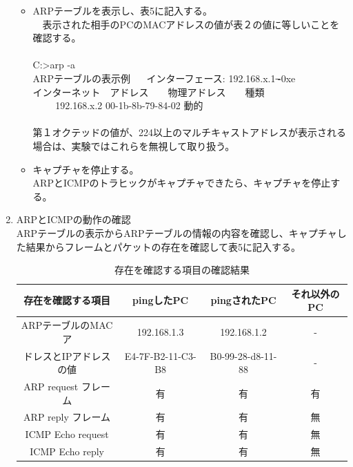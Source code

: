 \documentclass[10pt]{article}
\begin{document}
\begin{enumerate}
\begin{itemize}
        
            \item ARPテーブルを表示し、表5に記入する。\\ 　表示された相手のPCのMACアドレスの値が表２の値に等しいことを確認する。\\\\
                     C:>arp -a \\
                        ARPテーブルの表示例 　
                        インターフェース: 192.168.x.1 ̶-0xe \\ 
                        インターネット　アドレス　　物理アドレス　　種類\\ 　　
                        192.168.x.2 \hspace{1cm} 00-1b-8b-79-84-02\hspace{0.3cm}   動的 \\\\
             \text{*}第１オクテッドの値が、224以上のマルチキャストアドレスが表示される場合は、実験ではこれらを無視して取り扱う。
             \pagebreak
             \item キャプチャを停止する。\\
             ARPとICMPのトラヒックがキャプチャできたら、キャプチャを停止する。
         \end{itemize}
    \item ARPとICMPの動作の確認 \\
        ARPテーブルの表示からARPテーブルの情報の内容を確認し、キャプチャした結果からフレームとパケットの存在を確認して表5に記入する。
        
        \begingroup
        \setlength{\tabcolsep}{5pt} %
        \renewcommand{\arraystretch}{1.5} %
        \begin{table}[H]
        \centering
    	\caption{存在を確認する項目の確認結果}
    	\begin{tabular}{|c|c|c|c|} 
    	\hline
    	    存在を確認する項目 & pingしたPC & pingされたPC & それ以外のPC \\
    	    \hline\hline
    	    ARPテーブルのMACア &  192.168.1.3  & 192.168.1.2 & - \\
    	    ドレスとIPアドレスの値 & E4-7F-B2-11-C3-B8 & B0-99-28-d8-11-88 & - \\ [0.5ex] 
    		\hline
    			ARP request フレーム & 有 & 有 & 有 \\ \hline
    			ARP reply フレーム & 有 & 有 & 無 \\ \hline
    			ICMP Echo request & 有 & 有 & 無 \\ \hline
            	ICMP Echo reply & 有 & 有 & 無 \\ \hline
                

\end{tabular}
\end{table}
\end{enumerate}
\end{document}
